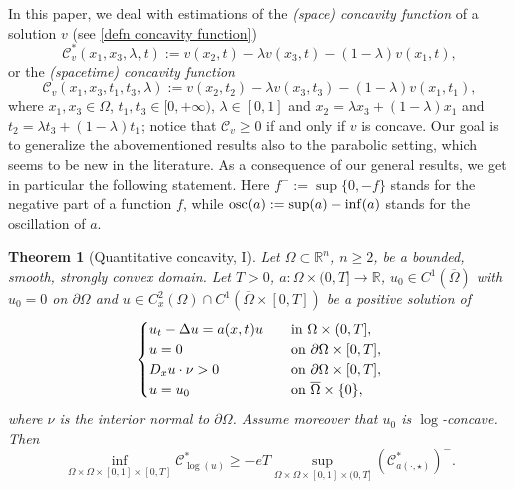 \documentclass[11pt, reqno]{amsart}
\newtheorem{theorem}[lemma]{Theorem}
\theoremstyle{definition}
\numberwithin{equation}{section}
\newcommand{\Omegabar}{\overline{\Omega}}
\newcommand{\R}{\mathbb{R}}
\newcommand{\mc}[1]{\mathcal{#1}}
\newcommand{\osc}{{\rm osc}}
\begin{document}
\smallskip

In this paper, we deal with estimations of the \emph{(space) concavity function} of a solution $v$ (see \eqref{defn concavity function})
$$ \mathcal{C}^*_v(x_1,x_3,\lambda, t) :=v(x_2, t)-\lambda v(x_3, t)-(1-\lambda)v(x_1,t), $$
or the \emph{(spacetime) concavity function}
$$\mathcal{C}_v(x_1,x_3,t_1,t_3,\lambda):= v(x_2,t_2)-\lambda v(x_3,t_3)-(1-\lambda)v(x_1,t_1),$$
where $x_1, x_3 \in \Omega $, $t_1, t_3 \in [0,+\infty)$, $\lambda \in [0,1]$ and $x_2=\lambda x_3+(1-\lambda)x_1$ and $t_2=\lambda t_3+(1-\lambda)t_1$; notice that $\mc{C}_v \geq 0$ if and only if $v$ is concave. 
Our goal is to generalize the abovementioned results also to the parabolic setting, which seems to be new in the literature.
As a consequence of our general results, we get in particular the following statement. Here $f^- := \sup\{0,-f\}$ stands for the negative part of a function $f$, while $\osc(a):= \sup(a) - \inf(a)$ stands for the oscillation of $a$.


\begin{theorem}[Quantitative concavity, I]\label{approximate concavity parabolic application a(x)u introduction}
Let $\Omega \subset \R^n$, $n\geq 2$, be a bounded, smooth, strongly convex domain. 
Let $T>0$, $a\colon \Omega \times (0,T] \to \R$, $u_0\in C^1(\Omegabar)$ with $u_0=0$ on $\partial\Omega$ and $u \in C^2_x(\Omega) \cap C^1(\Omegabar\times[0,T])$ be a positive solution of
$$		
\begin{cases}
u_t - \Delta u = a(x,t) u &\quad \hbox{in $\Omega \times (0,T]$}, \\
u=0 & \quad\text{on }\partial \Omega\times [0,T],	 \\
D_x u \cdot \nu >0 & \quad\text{on }\partial \Omega\times [0,T], \\
u =u_0 & \quad \text{on } \Omegabar \times \{0\},
\end{cases}
$$
where $\nu$ is the interior normal to $\partial \Omega$. 
Assume moreover that $u_0$ is $\log$-concave. 
 Then
$$\inf_{\Omega \times \Omega \times [0,1] \times [0,T]} \mc{C}^*_{\log(u)} \geq -e T \sup_{\Omega \times \Omega \times [0,1] \times (0,T]} \left(\mc{C}^*_{a(\cdot, \star)}\right)^-.$$
\end{theorem}
\end{document}
